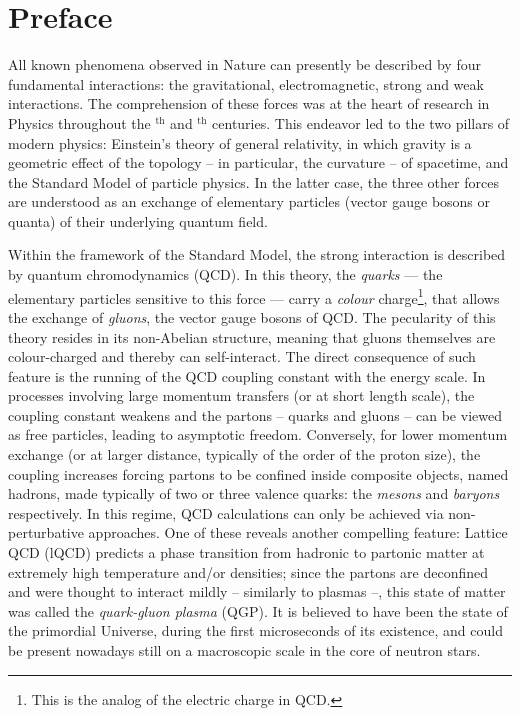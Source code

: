 \chapter{Preface}
\label{chap:Chapter1}

All known phenomena observed in Nature can presently be described by four fundamental interactions: the gravitational, electromagnetic, strong and weak interactions. The comprehension of these forces was at the heart of research in Physics throughout the $^{\textrm{th}}$ and $^{\textrm{th}}$ centuries. This endeavor led to the two pillars of modern physics: Einstein's theory of general relativity, in which gravity is a geometric effect of the topology -- in particular, the curvature -- of spacetime, and the Standard Model of particle physics. In the latter case, the three other forces are understood as an exchange of elementary particles (vector gauge bosons or quanta) of their underlying quantum field.

Within the framework of the Standard Model, the strong interaction is described by quantum chromodynamics (QCD). In this theory, the \textit{quarks} --- the elementary particles sensitive to this force --- carry a \textit{colour} charge\footnote{This is the analog of the electric charge in QCD.}, that allows the exchange of \textit{gluons}, the vector gauge bosons of QCD. The pecularity of this theory resides in its non-Abelian structure, meaning that gluons themselves are colour-charged and thereby can self-interact. The direct consequence of such feature is the running of the QCD coupling constant with the energy scale. In processes involving large momentum transfers (or at short length scale), the coupling constant weakens and the partons -- quarks and gluons -- can be viewed as free particles, leading to asymptotic freedom. Conversely, for lower momentum exchange (or at larger distance, typically of the order of the proton size), the coupling increases forcing partons to be confined inside composite objects, named hadrons, made typically of two or three valence quarks: the \textit{mesons} and \textit{baryons} respectively. In this regime, QCD calculations can only be achieved via non-perturbative approaches. One of these reveals another compelling feature: Lattice QCD (lQCD) predicts a phase transition from hadronic to partonic matter at extremely high temperature and/or densities; since the partons are deconfined and were thought to interact mildly -- similarly to plasmas --, this state of matter was called the \textit{quark-gluon plasma} (QGP). It is believed to have been the state of the primordial Universe, during the first microseconds of its existence, and could be present nowadays still on a macroscopic scale in the core of neutron stars. \\

